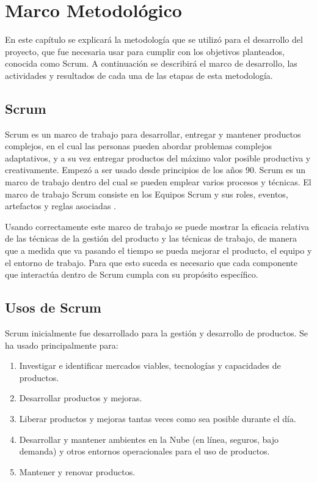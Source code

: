 \chapter{Marco Metodológico}
En este capítulo se explicará la metodología que se utilizó para el desarrollo del proyecto, que fue necesaria usar para cumplir con los objetivos planteados, conocida como Scrum. A continuación se describirá el marco de desarrollo, las actividades y resultados de cada una de las etapas de esta metodología.

\section{Scrum}
Scrum es un marco de trabajo para desarrollar, entregar y mantener productos complejos, en el cual las personas pueden abordar problemas complejos adaptativos, y a su vez entregar productos del máximo valor posible productiva y creativamente. Empezó a ser usado desde principios de los años 90. Scrum es un marco de trabajo dentro del cual se pueden emplear varios procesos y técnicas. El marco de trabajo Scrum consiste en los Equipos Scrum y sus roles, eventos, artefactos y reglas asociadas \cite{scrumSchwaber}.

Usando correctamente este marco de trabajo se puede mostrar la eficacia relativa de las técnicas de la gestión del producto y las técnicas de trabajo, de manera que a medida que va pasando el tiempo se pueda mejorar el producto, el equipo y el entorno de trabajo. Para que esto suceda es necesario que cada componente que interactúa dentro de Scrum cumpla con su propósito específico.

\section{Usos de Scrum}
Scrum inicialmente fue desarrollado para la gestión y desarrollo de productos. Se ha usado principalmente para:

\begin{enumerate}
	\item Investigar e identificar mercados viables, tecnologías y capacidades de productos.
	\item Desarrollar productos y mejoras.
	\item Liberar productos y mejoras tantas veces como sea posible durante el día.
	\item Desarrollar y mantener ambientes en la Nube (en línea, seguros, bajo demanda) y otros entornos operacionales para el uso de productos.
	\item Mantener y renovar productos.
\end{enumerate}


